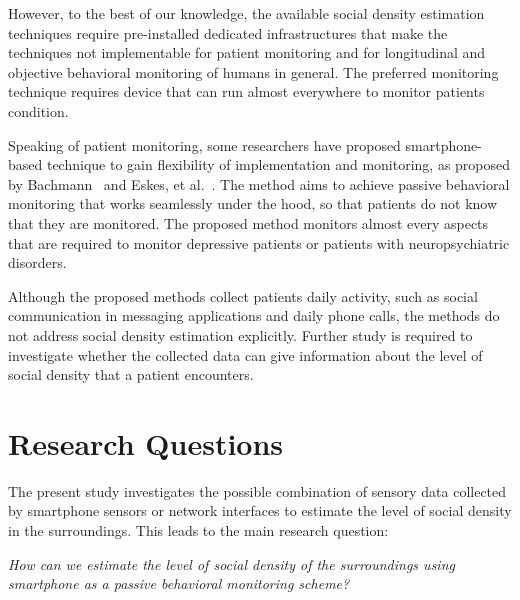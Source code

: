 However, to the best of our knowledge, the available social density estimation techniques require pre-installed dedicated infrastructures that make the techniques not implementable for patient monitoring and
for longitudinal and objective behavioral monitoring of humans in general.
The preferred monitoring technique requires device that can run almost everywhere to monitor patients condition.

Speaking of patient monitoring, some researchers have proposed smartphone-based technique to gain flexibility of implementation and monitoring, as proposed by Bachmann~\cite{thesis031} and Eskes, et al.~\cite{thesis015}. The method aims to achieve passive behavioral monitoring that works seamlessly under the hood, so that patients do not know that they are monitored. The proposed method monitors almost every aspects that are required to monitor depressive patients or patients with neuropsychiatric disorders.

Although the proposed methods collect patients daily activity, such as social communication in messaging applications and daily phone calls, the methods do not address social density estimation explicitly. Further study is required to investigate whether the collected data can give information about the level of social density that a patient encounters. 

\section{Research Questions} %
\label{sec:research_questions}
The present study investigates the possible combination of sensory data collected by smartphone sensors or network interfaces to estimate the level of social density in the surroundings. 
This leads to the main research question:
\begin{displayquote}
\textit{How can we estimate the level of social density of the surroundings using smartphone as a passive behavioral monitoring scheme?}
\end{displayquote}

